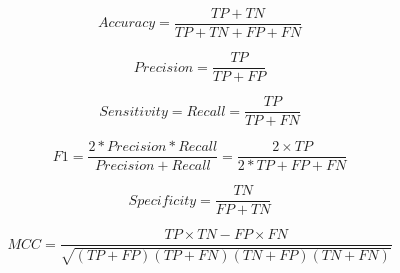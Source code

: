 \begin{equation}\label{equa:acc}
	Accuracy = \frac{TP+TN}{TP+TN+FP+FN}
\end{equation}

\begin{equation}\label{equa:precision}
	Precision = \frac{TP}{TP+FP}
\end{equation}

\begin{equation}\label{equa:recall}
	Sensitivity = Recall = \frac{TP}{TP+FN}
\end{equation}

\begin{equation}\label{equa:f1}
	F1 = \frac{2*Precision*Recall}{Precision+Recall} = \frac{2 \times TP}{2*TP+FP+FN}
\end{equation}


\begin{equation}\label{equa:FPR}
	Specificity = \frac{TN}{FP+TN}
\end{equation}

\begin{equation}\label{equa:MCC}
	MCC = \frac{TP \times TN - FP \times FN}{ \sqrt{ (TP+FP)(TP  + FN)(TN+FP)(TN+FN)}  }
\end{equation}

